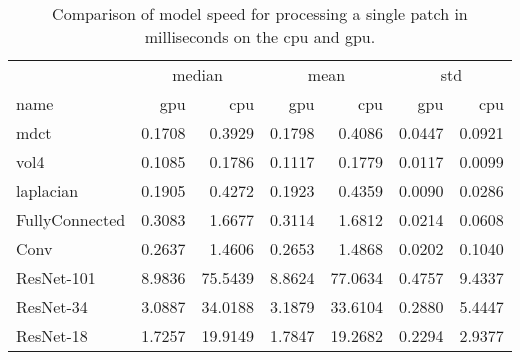 \begin{table}[ht]
    \centering
    \caption{Comparison of model speed for processing a single patch in milliseconds on the \ac{cpu} and \ac{gpu}.}
    \label{tab:Results:Computation:Speed}
    \begin{tabular}{|l|rr|rr|rr|}
        \hline
        \multicolumn{1}{|c|}{} & \multicolumn{2}{c|}{median} & \multicolumn{2}{c|}{mean} & \multicolumn{2}{c|}{std} \\
        name & \acs{gpu} & \acs{cpu} & \acs{gpu} & \acs{cpu} & \acs{gpu} & \acs{cpu} \\
        \hline
        \acs{mdct}      & 0.1708 &  0.3929 & 0.1798 &  0.4086 & 0.0447 & 0.0921 \\
        \acs{vol4}      & 0.1085 &  0.1786 & 0.1117 &  0.1779 & 0.0117 & 0.0099 \\
        \acs{laplacian} & 0.1905 &  0.4272 & 0.1923 &  0.4359 & 0.0090 & 0.0286 \\
        \hline
        FullyConnected  & 0.3083 &  1.6677 & 0.3114 &  1.6812 & 0.0214 & 0.0608 \\
        Conv            & 0.2637 &  1.4606 & 0.2653 &  1.4868 & 0.0202 & 0.1040 \\
        ResNet-101      & 8.9836 & 75.5439 & 8.8624 & 77.0634 & 0.4757 & 9.4337 \\
        ResNet-34       & 3.0887 & 34.0188 & 3.1879 & 33.6104 & 0.2880 & 5.4447 \\
        ResNet-18       & 1.7257 & 19.9149 & 1.7847 & 19.2682 & 0.2294 & 2.9377 \\
        \hline
    \end{tabular}
\end{table}




